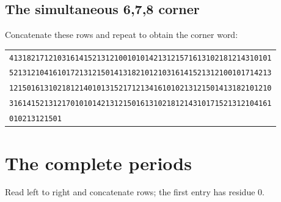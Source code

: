 \documentclass[11pt,reqno]{amsart}
\theoremstyle{plain}
\theoremstyle{plain}
\theoremstyle{plain}
\begin{document}
\subsection{The simultaneous 6,7,8 corner}
Concatenate these rows and repeat to obtain the corner word:
\begin{center}\small
\begin{tabular}{l}
\texttt{413182171210316141521312100101014213121571613102181214310101} \\
\texttt{521312104161017213121501413182101210316141521312100101714213} \\
\texttt{121501613102181214010131521712134161010213121501413182101210} \\
\texttt{316141521312170101014213121501613102181214310171521312104161} \\
\texttt{010213121501} \\
\end{tabular}
\end{center}

\section{The complete periods}\label{S-supp:periods}

Read left to right and concatenate rows; the first entry has residue $0$.
\end{document}
